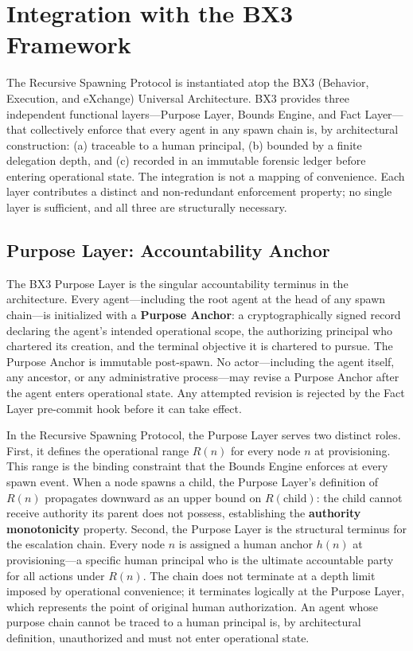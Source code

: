 \section{Integration with the BX3 Framework}
\label{sec:bx3-integration}

The Recursive Spawning Protocol is instantiated atop the BX3 (Behavior, Execution, and eXchange) Universal Architecture. BX3 provides three independent functional layers---Purpose Layer, Bounds Engine, and Fact Layer---that collectively enforce that every agent in any spawn chain is, by architectural construction: (a) traceable to a human principal, (b) bounded by a finite delegation depth, and (c) recorded in an immutable forensic ledger before entering operational state. The integration is not a mapping of convenience. Each layer contributes a distinct and non-redundant enforcement property; no single layer is sufficient, and all three are structurally necessary.

\subsection{Purpose Layer: Accountability Anchor}

The BX3 Purpose Layer is the singular accountability terminus in the architecture. Every agent---including the root agent at the head of any spawn chain---is initialized with a \textbf{Purpose Anchor}: a cryptographically signed record declaring the agent's intended operational scope, the authorizing principal who chartered its creation, and the terminal objective it is chartered to pursue. The Purpose Anchor is immutable post-spawn. No actor---including the agent itself, any ancestor, or any administrative process---may revise a Purpose Anchor after the agent enters operational state. Any attempted revision is rejected by the Fact Layer pre-commit hook before it can take effect.

In the Recursive Spawning Protocol, the Purpose Layer serves two distinct roles. First, it defines the operational range $R(n)$ for every node $n$ at provisioning. This range is the binding constraint that the Bounds Engine enforces at every spawn event. When a node spawns a child, the Purpose Layer's definition of $R(n)$ propagates downward as an upper bound on $R(\text{child})$: the child cannot receive authority its parent does not possess, establishing the \textbf{authority monotonicity} property. Second, the Purpose Layer is the structural terminus for the escalation chain. Every node $n$ is assigned a human anchor $h(n)$ at provisioning---a specific human principal who is the ultimate accountable party for all actions under $R(n)$. The chain does not terminate at a depth limit imposed by operational convenience; it terminates logically at the Purpose Layer, which represents the point of original human authorization. An agent whose purpose chain cannot be traced to a human principal is, by architectural definition, unauthorized and must not enter operational state.

